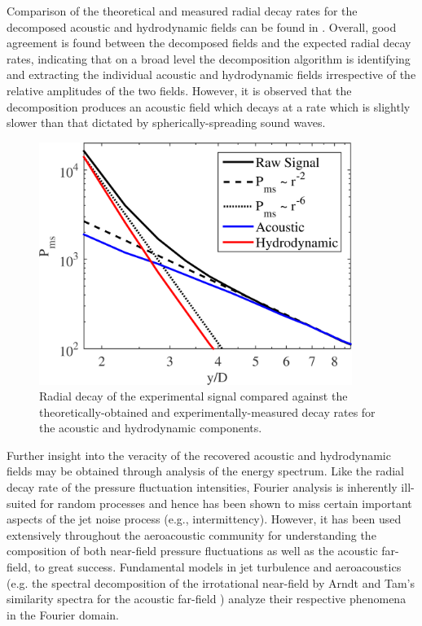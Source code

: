 Comparison of the theoretical and measured radial decay rates for the decomposed acoustic and hydrodynamic fields can be found in .
Overall, good agreement is found between the decomposed fields and the expected radial decay rates, indicating that on a broad level the decomposition algorithm is identifying and extracting the individual acoustic and hydrodynamic fields irrespective of the relative amplitudes of the two fields.
However, it is observed that the decomposition produces an acoustic field which decays at a rate which is slightly slower than that dictated by spherically-spreading sound waves. 
\begin{figure}
	\centering
	\includegraphics[width=4in]{Figures/ch3_validation_Pms_v2.png}
	\caption{Radial decay of the experimental signal compared against the theoretically-obtained and experimentally-measured decay rates for the acoustic and hydrodynamic components.}
	\label{fig:ch3_validation_Pms}
\end{figure}

Further insight into the veracity of the recovered acoustic and hydrodynamic fields may be obtained through analysis of the energy spectrum.
Like the radial decay rate of the pressure fluctuation intensities, Fourier analysis is inherently ill-suited for random processes and hence has been shown to miss certain important aspects of the jet noise process (e.g.,  intermittency). 
However, it has been used extensively throughout the aeroacoustic community for understanding the composition of both near-field pressure fluctuations as well as the acoustic far-field, to great success. 
Fundamental models in jet turbulence and aeroacoustics (e.g. the spectral decomposition of the irrotational near-field by Arndt \etal \citep{Arndt1997} and Tam’s similarity spectra for the acoustic far-field \citep{Tam1996}) analyze their respective phenomena in the Fourier domain.

